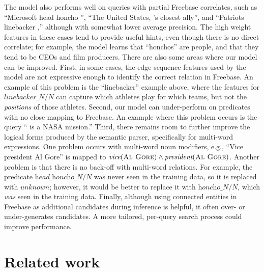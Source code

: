 \documentclass[11pt,letterpaper]{article}
\newcommand{\blank}{\underline{\hspace{.5cm}}}
\newcommand{\lexicalpredicate}[1]{\ensuremath{\textit{#1}}}
\newcommand{\entity}[1]{\ensuremath{\textsc{#1}}}
\begin{document}
The model also performs well on queries with partial Freebase correlates, such as ``Microsoft head
honcho \blank{}'', ``The United States, \blank{}'s closest ally'', and ``Patriots linebacker
\blank{},'' although with somewhat lower average precision. The high weight features in these cases
tend to provide useful hints, even though there is no direct correlate; for example, the model
learns that ``honchos'' are people, and that they tend to be CEOs and film producers.  There are also some areas where our model can be improved. First, in some cases, the edge sequence
features used by the model are not expressive enough to identify the correct relation in Freebase.
An example of this problem is the ``linebacker'' example above, where the features for
\lexicalpredicate{linebacker\_N/N} can capture which athletes play for which teams, but not the
\emph{positions} of those athletes. Second, our model can under-perform on predicates with no close
mapping to Freebase. An example where this problem occurs is the query ``\blank{} is a NASA
mission.'' Third, there remains room to further improve the logical forms produced by the semantic
parser, specifically for multi-word expressions. One problem occurs with multi-word noun modifiers,
e.g., ``Vice president Al Gore'' is mapped to $\lexicalpredicate{vice}(\entity{Al Gore}) \land
\lexicalpredicate{president}(\entity{Al Gore})$. Another problem is that there is no back-off with
multi-word relations. For example, the predicate \lexicalpredicate{head\_honcho\_N/N} was never
seen in the training data, so it is replaced with \lexicalpredicate{unknown}; however, it would be
better to replace it with \lexicalpredicate{honcho\_N/N}, which \emph{was} seen in the training
data. Finally, although using connected entities in Freebase as additional candidates during
inference is helpful, it often over- or under-generates candidates. A more tailored, per-query
search process could improve performance.

\vspace{-2.00mm}
\section{Related work}
\end{document}
